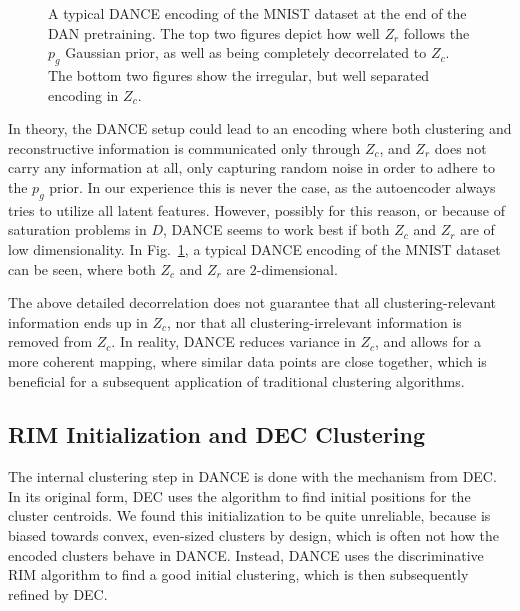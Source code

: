 \begin{figure}[!ht]
{					\label{fig:enc_mnist_zc_lab}
				}
				\caption[Typical DANCE encoding of MNIST]{A typical \ac{DANCE} encoding of the MNIST dataset at the end of the \ac{DAN} pretraining. The top two figures depict how well $Z_r$ follows the $p_g$ Gaussian prior, as well as being completely decorrelated to $Z_c$. The bottom two figures show the irregular, but well separated encoding in $Z_c$.}
				\label{fig:enc_mnist}
			\end{figure}
			
			In theory, the \ac{DANCE} setup could lead to an encoding where both clustering and reconstructive information is communicated only through $Z_c$, and $Z_r$ does not carry any information at all, only capturing random noise in order to adhere to the $p_g$ prior.
			In our experience this is never the case, as the autoencoder always tries to utilize all latent features. 
			However, possibly for this reason, or because of saturation problems in $D$, \ac{DANCE} seems to work best if both $Z_c$ and $Z_r$ are of low dimensionality.
			In Fig.~\ref{fig:enc_mnist}, a typical \ac{DANCE} encoding of the MNIST dataset can be seen, where both $Z_c$ and $Z_r$ are $2$-dimensional.
			
			The above detailed decorrelation does not guarantee that all clustering-relevant information ends up in $Z_c$, nor that all clustering-irrelevant information is removed from $Z_c$.
			In reality, \ac{DANCE} reduces variance in $Z_c$, and allows for a more coherent mapping, where similar data points are close together, which is beneficial for a subsequent application of traditional clustering algorithms.
			
		\subsection{RIM Initialization and DEC Clustering}
			\label{cha:decorr_ae:sec:rim_init_dec_clust}
		
			The internal clustering step in \ac{DANCE} is done with the mechanism from \ac{DEC}.
			In its original form, \ac{DEC} uses the \kmeans{} algorithm to find initial positions for the cluster centroids.
			We found this initialization to be quite unreliable, because \kmeans{} is biased towards convex, even-sized clusters by design, which is often not how the encoded clusters behave in \ac{DANCE}.
			Instead, \ac{DANCE} uses the discriminative \ac{RIM} \cite{rim} algorithm to find a good initial clustering, which is then subsequently refined by \ac{DEC}.
			
